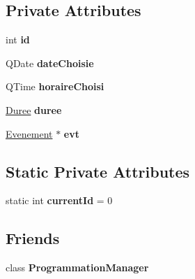 \subsection*{Private Attributes}
\begin{DoxyCompactItemize}
\item 
\hypertarget{class_programmation_a94015d566f0afca80fea7b888f93c727}{}int {\bfseries id}\label{class_programmation_a94015d566f0afca80fea7b888f93c727}

\item 
\hypertarget{class_programmation_ac4d9c0b80ab3b203122b94d690871100}{}Q\+Date {\bfseries date\+Choisie}\label{class_programmation_ac4d9c0b80ab3b203122b94d690871100}

\item 
\hypertarget{class_programmation_a7b51bcd99f633bb34903c9471ccc792b}{}Q\+Time {\bfseries horaire\+Choisi}\label{class_programmation_a7b51bcd99f633bb34903c9471ccc792b}

\item 
\hypertarget{class_programmation_a1cdf70965e5af5a917e3bc7c922a735e}{}\hyperlink{class_duree}{Duree} {\bfseries duree}\label{class_programmation_a1cdf70965e5af5a917e3bc7c922a735e}

\item 
\hypertarget{class_programmation_ac64a1d3793894549ff5b3a2c9015aef2}{}\hyperlink{class_evenement}{Evenement} $\ast$ {\bfseries evt}\label{class_programmation_ac64a1d3793894549ff5b3a2c9015aef2}

\end{DoxyCompactItemize}
\subsection*{Static Private Attributes}
\begin{DoxyCompactItemize}
\item 
\hypertarget{class_programmation_a7a72d00fe285adc58d40405cb7b709d5}{}static int {\bfseries current\+Id} = 0\label{class_programmation_a7a72d00fe285adc58d40405cb7b709d5}

\end{DoxyCompactItemize}
\subsection*{Friends}
\begin{DoxyCompactItemize}
\item 
\hypertarget{class_programmation_ade7bfcbf8cec66b12064c8ff25993d73}{}class {\bfseries Programmation\+Manager}\label{class_programmation_ade7bfcbf8cec66b12064c8ff25993d73}

\end{DoxyCompactItemize}


